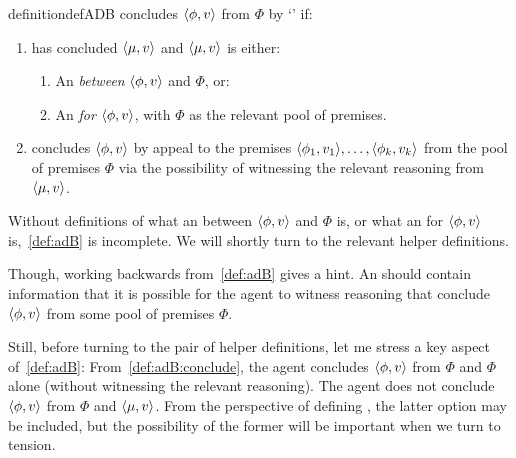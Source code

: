 \begin{note}
  \begin{restatable}[\adB{}]{definition}{defADB}
    \label{def:adB}
    \vAgent{} concludes \(\langle \phi, v \rangle\) from \(\Phi\) by `\adB{}' if:
    \begin{enumerate}[label=\textsf{I}:\arabic*., ref=(\textsf{I}:\arabic*)]
    \item
      \label{def:adB:itp}
      \vAgent{} has concluded \(\langle \mu, v \rangle\) and  \(\langle \mu, v \rangle\) is either:
      \begin{enumerate}
      \item
        \label{def:adB:itp:between}
        An \itp{} \emph{between} \(\langle \phi, v \rangle\) and \(\Phi\), or:
      \item
        \label{def:adB:itp:for}
        An \itp{} \emph{for} \(\langle \phi, v \rangle\), with \(\Phi\) as the relevant pool of premises.
      \end{enumerate}
    \item
      \label{def:adB:conclude}
      \vAgent{} concludes \(\langle \phi, v \rangle\) by appeal to the premises \(\langle \phi_{1}, v_{1} \rangle,\dots,\langle \phi_{k}, v_{k} \rangle\) from the pool of premises \(\Phi\) via the possibility of witnessing the relevant reasoning from \(\langle \mu, v \rangle\).
    \end{enumerate}
    \vspace{-\baselineskip}
  \end{restatable}
\end{note}

\begin{note}
  Without definitions of what an  between \(\langle \phi, v \rangle\) and \(\Phi\) is, or what an  for \(\langle \phi, v \rangle\) is,~\autoref{def:adB} is incomplete.
  We will shortly turn to the relevant helper definitions.

  Though, working backwards from~\autoref{def:adB} gives a hint.
  An \itp{} should contain information that it is possible for the agent to witness reasoning that conclude \(\langle \phi, v \rangle\) from some pool of premises \(\Phi\).
\end{note}

\begin{note}
  Still, before turning to the pair of helper definitions, let me stress a key aspect of~\autoref{def:adB}:
  From~\ref{def:adB:conclude}, the agent concludes \(\langle \phi, v \rangle\) from \(\Phi\) and \(\Phi\) alone (without witnessing the relevant reasoning).
  The agent does not conclude \(\langle \phi, v \rangle\) from \(\Phi\) and \(\langle \mu, v \rangle\).
  From the perspective of defining \adB{}, the latter option may be included, but the possibility of the former will be important when we turn to tension.
\end{note}

